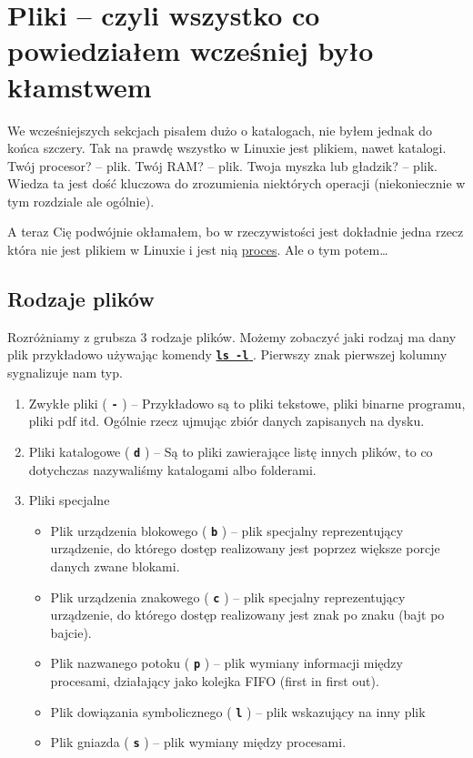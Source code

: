 \documentclass[12pt]{article}
\newcommand{\ttbf}[1]{
    \texttt{\textbf{#1}}
}
\begin{document}
\section{Pliki -- czyli wszystko co powiedziałem wcześniej było kłamstwem}
\label{sec:files}

We wcześniejszych sekcjach pisałem dużo o katalogach, nie byłem jednak do końca szczery. Tak na prawdę wszystko w Linuxie jest plikiem, nawet katalogi. Twój procesor? -- plik. Twój RAM? -- plik. Twoja myszka lub gładzik? -- plik. Wiedza ta jest dość kluczowa do zrozumienia niektórych operacji (niekoniecznie w tym rozdziale ale ogólnie).

A teraz Cię podwójnie okłamałem, bo w rzeczywistości jest dokładnie jedna rzecz która nie jest plikiem w Linuxie i jest nią \hyperref[sec:process]{proces}. Ale o tym potem\dots

\subsection{Rodzaje plików}

Rozróżniamy z grubsza 3 rodzaje plików. Możemy zobaczyć jaki rodzaj ma dany plik przykładowo używając komendy \hyperref[sec:ls]{\ttbf{ls -l}}. Pierwszy znak pierwszej kolumny sygnalizuje nam typ.

\begin{enumerate}
    \item Zwykłe pliki (\ttbf{-}) -- Przykładowo są to pliki tekstowe, pliki binarne programu, pliki pdf itd. Ogólnie rzecz ujmując zbiór danych zapisanych na dysku.
    \item Pliki katalogowe (\ttbf{d}) -- Są to pliki zawierające listę innych plików, to co dotychczas nazywaliśmy katalogami albo folderami.
    \item Pliki specjalne
    \begin{itemize}
        \item Plik urządzenia blokowego (\ttbf{b}) -- plik specjalny reprezentujący urządzenie, do którego dostęp realizowany jest poprzez większe porcje danych zwane blokami.
        \item Plik urządzenia znakowego (\ttbf{c}) -- plik specjalny reprezentujący urządzenie, do którego dostęp realizowany jest znak po znaku (bajt po bajcie).
        \item Plik nazwanego potoku (\ttbf{p}) -- plik wymiany informacji między procesami, działający jako kolejka FIFO (first in first out).
        \item Plik dowiązania symbolicznego (\ttbf{l}) -- plik wskazujący na inny plik
        \item Plik gniazda (\ttbf{s}) -- plik wymiany między procesami.
    \end{itemize}
\end{enumerate}
\end{document}
